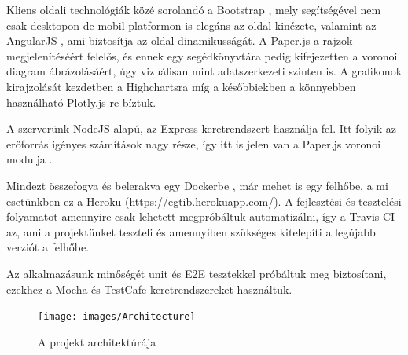 Kliens oldali technológiák közé sorolandó a Bootstrap \cite{soft:bootstrap}, mely segítségével nem csak desktopon de mobil platformon is elegáns az oldal kinézete, valamint az AngularJS \cite{soft:angular}, ami biztosítja az oldal dinamikusságát. A Paper.js \cite{soft:paper} a rajzok megjelenítéséért felelős, és ennek egy segédkönyvtára \cite{soft:voronoiModule} pedig kifejezetten a voronoi diagram ábrázolásáért, úgy vizuálisan mint adatszerkezeti szinten is. A grafikonok kirajzolását kezdetben a Highchartsra \cite{soft:highcharts} míg a későbbiekben a könnyebben használható Plotly.js-re \cite{soft:plotly} bíztuk.

A szerverünk NodeJS \cite{soft:node} alapú, az Express \cite{soft:express} keretrendszert használja fel. Itt folyik az erőforrás igényes számítások nagy része, így itt is jelen van a Paper.js voronoi modulja \cite{soft:voronoiModule}.

Mindezt összefogva és belerakva egy Dockerbe \cite{soft:docker}, már mehet is egy felhőbe, a mi esetünkben ez a Heroku (https://egtib.herokuapp.com/). A fejlesztési és tesztelési folyamatot amennyire csak lehetett megpróbáltuk automatizálni, így a Travis CI \cite{soft:travis} az, ami a projektünket teszteli és amennyiben szükséges kitelepíti a legújabb verziót a felhőbe.

Az alkalmazásunk minőségét unit és E2E tesztekkel próbáltuk meg biztosítani, ezekhez a Mocha \cite{soft:mocha} és TestCafe \cite{soft:testcafe} keretrendszereket használtuk.

\begin{figure}[ht!]
	\centering
	\texttt{[image: images/Architecture]}
	\caption{A projekt architektúrája\label{fig:Architecture}}
\end{figure}
